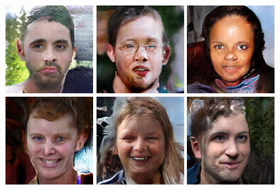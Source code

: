 \begin{figure}[!h]
{    }
    \vspace{0.1cm}
    \centerline{
        \includegraphics[scale=0.485]{figures/ffhq/random/ffhq128x128_image0021.png}
        \includegraphics[scale=0.485]{figures/ffhq/random/ffhq128x128_image0022.png}
        \includegraphics[scale=0.485]{figures/ffhq/random/ffhq128x128_image0023.png}
        \includegraphics[scale=0.485]{figures/ffhq/random/ffhq128x128_image0024.png}
        \includegraphics[scale=0.485]{figures/ffhq/random/ffhq128x128_image0025.png}
        \includegraphics[scale=0.485]{figures/ffhq/random/ffhq128x128_image0026.png}
}
\end{figure}
